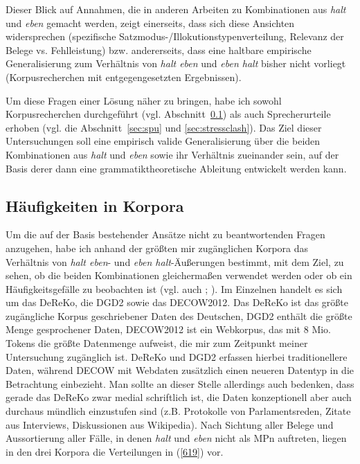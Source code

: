 Dieser Blick auf Annahmen, die in anderen Arbeiten zu Kombinationen aus \textit{halt} und \textit{eben} gemacht werden, zeigt einerseits, dass sich diese Ansichten widersprechen (spezifische Satzmodus-/Illokutionstypenverteilung, Relevanz der Be\-lege vs. Fehlleistung) bzw. andererseits, dass eine haltbare empirische Generalisierung zum Verhältnis von \textit{halt eben} und \textit{eben halt} bisher nicht vorliegt (Korpusrecher\-chen mit entgegengesetzten Ergebnissen). 

Um diese Fragen einer Lösung näher zu bringen, habe ich sowohl Korpusrecherchen durchgeführt (vgl. Abschnitt~\ref{sec:häufko}) als auch Sprecherurteile erhoben (vgl. die Abschnitt~\ref{sec:spu} und \ref{sec:stressclash}). Das Ziel dieser Untersuchungen soll eine empirisch valide Generalisierung über die beiden Kombinationen aus \textit{halt} und \textit{eben} sowie ihr Verhältnis zueinander sein, auf der Basis derer dann eine grammatiktheoretische Ableitung entwickelt werden kann.

\subsection{Häufigkeiten in Korpora}
\label{sec:häufko}
Um die auf der Basis bestehender Ansätze nicht zu beantwortenden Fragen anzugehen, habe ich anhand der größten mir zugänglichen Korpora das Verhältnis von \textit{halt eben}- und \textit{eben halt}-Äußerungen bestimmt, mit dem Ziel, zu sehen, ob die beiden Kombinationen gleichermaßen verwendet werden oder ob ein Häufigkeitsgefälle zu beobachten ist (vgl. auch \citealt[148-155]{Mueller2016b}; \citeyear[233-235]{Mueller2017a}). Im Einzelnen handelt es sich um das DeReKo, die DGD2 sowie das DECOW2012. Das DeReKo ist das größte zugängliche Korpus geschriebener Daten des Deutschen, DGD2 enthält die größte Menge gesprochener Daten, DECOW2012 ist ein Web\-korpus, das mit 8 Mio. Tokens die größte Datenmenge aufweist, die mir zum Zeitpunkt meiner Untersuchung zugänglich ist. DeReKo und DGD2 erfassen hier\-bei traditionellere Daten, während DECOW mit Webdaten zusätzlich einen neueren Datentyp in die Betrachtung einbezieht. Man sollte an dieser Stelle allerdings auch bedenken, dass gerade das DeReKo zwar medial schriftlich ist, die Daten konzeptionell aber auch durchaus mündlich einzustufen sind (z.B. Protokolle von Parlamentsreden, Zitate aus Interviews, Diskussionen aus Wikipedia). Nach Sichtung aller Belege und Aussortierung aller Fälle, in denen \textit{halt} und \textit{eben} nicht als MPn auftreten, liegen in den drei Korpora die Verteilungen in (\ref{619}) vor.

